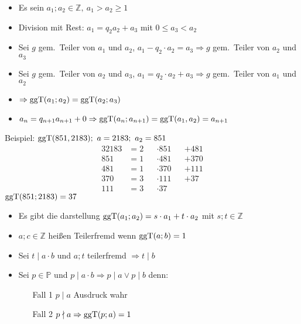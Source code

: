 \begin{itemize}
    \item Es sein $a_1;a_2 \in \mathbb{Z},\ a_1 > a_2 \geq 1$
    \item Division mit Rest: $a_1 = q_2 a_2 + a_3$ mit $0 \leq a_3 < a_2$
    \item Sei $g$ gem.\ Teiler von $a_1$ und $a_2$, $a_1 - q_2 \cdot a_2 = a_3 \Rightarrow g$ gem.\ Teiler von $a_2$ und $a_3$
    \item Sei $g$ gem.\ Teiler von $a_2$ und $a_3$, $a_1 = q_2 \cdot a_2 + a_3 \Rightarrow g$ gem.\ Teiler von $a_1$ und $a_2$
    \item $\Rightarrow \operatorname{ggT}(a_1;a_2) = \operatorname{ggT}(a_2;a_3)$
    \item $a_{n}=q_{n+1}a_{n+1} + 0 \Rightarrow \operatorname{ggT}(a_n;a_{n+1}) = \operatorname{ggT}(a_1,a_2) = a_{n+1}$
\end{itemize}
Beispiel: $\operatorname{ggT}(851,2183);\ a=2183;\ a_2 = 851$
\begin{alignat*}{3}
    2183 & = 2 &  & \cdot 851 &  & + 481 \\
    851  & = 1 &  & \cdot 481 &  & + 370 \\
    481  & = 1 &  & \cdot 370 &  & + 111 \\
    370  & = 3 &  & \cdot 111 &  & + 37  \\
    111  & = 3 &  & \cdot 37
\end{alignat*}
$\operatorname{ggT}(851;2183) = 37$
\begin{itemize}
    \item Es gibt die darstellung $\operatorname{ggT}(a_1;a_2) = s\cdot a_1 + t \cdot a_2$ mit $s;t \in \mathbb{Z}$
    \item $a;c \in \mathbb{Z}$ heißen Teilerfremd wenn $\operatorname{ggT}(a;b) = 1$
    \item Sei $t \mid a \cdot b$ und $a;t$ teilerfremd $\Rightarrow t \mid b$
    \item Sei $p \in \mathbb{P}$ und $p \mid a \cdot b \Rightarrow p \mid a \vee p \mid b$ denn:
    \begin{itemize}
        \item[Fall 1] $p \mid a$ Ausdruck wahr
        \item[Fall 2] $p \nmid a \Rightarrow \operatorname{ggT}(p;a) = 1$
    \end{itemize}
\end{itemize}
